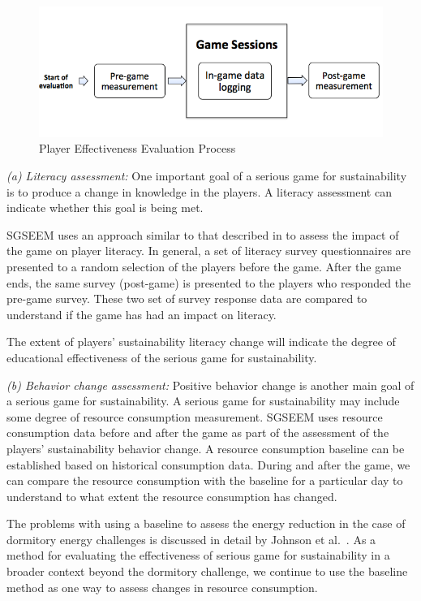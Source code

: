 \documentclass{sigchi}
\begin{document}
\begin{figure}
  \center
  \includegraphics[width=\columnwidth]{pre-post-eval}
  \caption{Player Effectiveness Evaluation Process}
  \label{fig:pre-post-eval}
\end{figure}

\emph {(a) Literacy assessment:} One important goal of a serious
game for sustainability is to produce a change in knowledge in the
players. A literacy assessment can indicate whether this goal is being met.

SGSEEM uses an approach similar to that described in \cite{csdl2-10-08} to
assess the impact of the game on player literacy. In general, a set of literacy survey
questionnaires are presented to a random selection of the players 
before the game. After the game ends, the same survey
(post-game) is presented to the players who responded the
pre-game survey. These two set of survey response data are
compared to understand if the game has had an impact on literacy.

The extent of players' sustainability literacy change will indicate
the degree of educational effectiveness of the serious game for
sustainability.

\emph {(b) Behavior change assessment:} Positive behavior change is
another main goal of a serious game for sustainability. A serious game
for sustainability may include some degree of resource
consumption measurement. SGSEEM uses resource consumption data before and
after the game as part of the assessment of the
players' sustainability behavior change.  A resource consumption
baseline can be established based on historical
consumption data. During and after the game, we can compare the
resource consumption with the baseline for a particular day to
understand to what extent the resource consumption has changed.

The problems with using a baseline to assess the energy reduction in the case of dormitory
energy challenges is discussed in detail by Johnson et al.~\cite{csdl2-12-08}. As a method
for evaluating the effectiveness of serious game for sustainability in a broader context
beyond the dormitory challenge, we continue to use the baseline method as one way to
assess changes in resource consumption.
\end{document}
